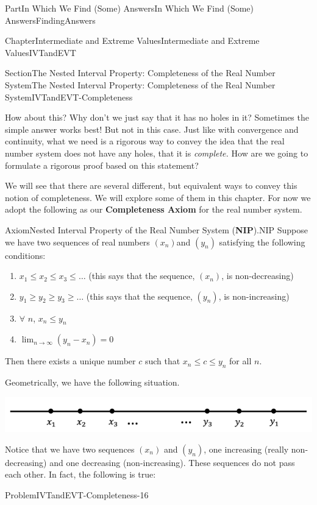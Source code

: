 \documentclass[oneside,10pt,]{book}
\newcommand{\terminology}[1]{\textbf{#1}}
\numberwithin{equation}{part}
\begin{document}
\begin{partptx}{Part}{In Which We Find (Some) Answers}{}{In Which We Find (Some) Answers}{}{}{FindingAnswers}
\begin{chapterptx}{Chapter}{Intermediate and Extreme Values}{}{Intermediate and Extreme Values}{}{}{IVTandEVT}
\begin{sectionptx}{Section}{The Nested Interval Property: Completeness of the Real Number System}{}{The Nested Interval Property: Completeness of the Real Number System}{}{}{IVTandEVT-Completeness}
\par
How about this?  Why don't we just say that it has no holes in it?  Sometimes the simple answer works best!  But not in this case. Just like with convergence and continuity, what we need is a rigorous way to convey the idea that the real number system does not have any holes, that it is \emph{complete.} How are we going to formulate a rigorous proof based on this statement?%
\par
We will see that there are several different, but equivalent ways to convey this notion of completeness.  We will explore some of them in this chapter.  For now we adopt the following as our \terminology{Completeness Axiom} for the real number system.%
\begin{axiom}{Axiom}{Nested Interval Property of the Real Number System (\terminology{NIP}).}{}{NIP}%
%
Suppose we have two sequences of real numbers \(\left(x_n\right)\)and \(\left(y_n\right)\) satisfying the following conditions:%
\par
%
\begin{enumerate}
\item{}\(x_1\leq x_2\leq x_3\leq\ldots\) (this says that the sequence, \(\left(x_n\right)\), is non-decreasing)%
\item{}\(y_1\geq y_2\geq y_3\geq\ldots\) (this says that the sequence, \(\left(y_n\right)\), is non-increasing)%
\item{}\(\forall\) \(n\), \(x_n\leq y_n\)%
\item{}\(\displaystyle \lim_{n\rightarrow\infty}\left(y_n-x_n\right)=0\)%
\end{enumerate}
%
\par
Then there exists a unique number \(c\) such that \(x_n\leq c\leq y_n\) for all \(n\).%
\end{axiom}
Geometrically, we have the following situation.%
\begin{image}{0.125}{0.75}{0.125}{}%
\includegraphics[width=\linewidth]{external/images/Ch6fig3.png}
\end{image}%
Notice that we have two sequences \(\left(x_n\right)\) and \(\left(y_n\right)\), one increasing (really non-decreasing) and one decreasing (non-increasing).  These sequences do not pass each other.  In fact, the following is true:%
\begin{problem}{Problem}{}{IVTandEVT-Completeness-16}%

\end{problem}
\end{sectionptx}
\end{chapterptx}
\end{partptx}
\end{document}
